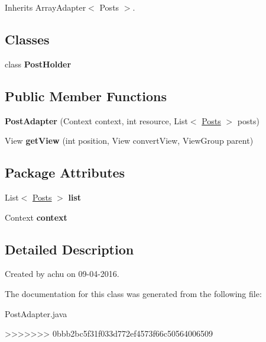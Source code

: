 \-Inherits \-Array\-Adapter$<$ Posts $>$.

\subsection*{\-Classes}
\begin{DoxyCompactItemize}
\item 
class {\bfseries \-Post\-Holder}
\end{DoxyCompactItemize}
\subsection*{\-Public \-Member \-Functions}
\begin{DoxyCompactItemize}
\item 
\hypertarget{classcom_1_1example_1_1sel_1_1lostfound_1_1PostAdapter_a58de5e8d3132dd70bfd35dcb44bf80e1}{{\bfseries \-Post\-Adapter} (\-Context context, int resource, \-List$<$ \hyperlink{classcom_1_1example_1_1sel_1_1lostfound_1_1Posts}{\-Posts} $>$ posts)}\label{classcom_1_1example_1_1sel_1_1lostfound_1_1PostAdapter_a58de5e8d3132dd70bfd35dcb44bf80e1}

\item 
\hypertarget{classcom_1_1example_1_1sel_1_1lostfound_1_1PostAdapter_aa2f3c1364857d97091ba325de3df6226}{\-View {\bfseries get\-View} (int position, \-View convert\-View, \-View\-Group parent)}\label{classcom_1_1example_1_1sel_1_1lostfound_1_1PostAdapter_aa2f3c1364857d97091ba325de3df6226}

\end{DoxyCompactItemize}
\subsection*{\-Package \-Attributes}
\begin{DoxyCompactItemize}
\item 
\hypertarget{classcom_1_1example_1_1sel_1_1lostfound_1_1PostAdapter_ab63de5ae17faa64acb6d9e9659f31b70}{\-List$<$ \hyperlink{classcom_1_1example_1_1sel_1_1lostfound_1_1Posts}{\-Posts} $>$ {\bfseries list}}\label{classcom_1_1example_1_1sel_1_1lostfound_1_1PostAdapter_ab63de5ae17faa64acb6d9e9659f31b70}

\item 
\hypertarget{classcom_1_1example_1_1sel_1_1lostfound_1_1PostAdapter_aa29b3df2bb916b5101261b51a1713b1a}{\-Context {\bfseries context}}\label{classcom_1_1example_1_1sel_1_1lostfound_1_1PostAdapter_aa29b3df2bb916b5101261b51a1713b1a}

\end{DoxyCompactItemize}


\subsection{\-Detailed \-Description}
\-Created by achu on 09-\/04-\/2016. 

\-The documentation for this class was generated from the following file\-:\begin{DoxyCompactItemize}
\item 
\-Post\-Adapter.\-java\end{DoxyCompactItemize}
>>>>>>> 0bbb2bc5f31f033d772ef4573f66c50564006509
